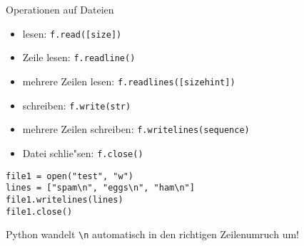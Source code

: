 \begin{frame}[fragile]{Operationen auf Dateien}
\begin{itemize}
\item \alert{lesen}: \lstinline{f.read([size])}
\item Zeile lesen: \lstinline{f.readline()}
\item mehrere Zeilen lesen: \lstinline{f.readlines([sizehint])}
\item \alert{schreiben}: \lstinline{f.write(str)}
\item mehrere Zeilen schreiben: \lstinline{f.writelines(sequence)}
\item Datei \alert{schlie"sen}: \lstinline{f.close()}
\end{itemize}
\begin{lstlisting}[style=Python]
file1 = open("test", "w")
lines = ["spam\n", "eggs\n", "ham\n"]
file1.writelines(lines)
file1.close()
\end{lstlisting}
Python wandelt \lstinline{\n} automatisch in den richtigen Zeilenumruch um!
\end{frame}
